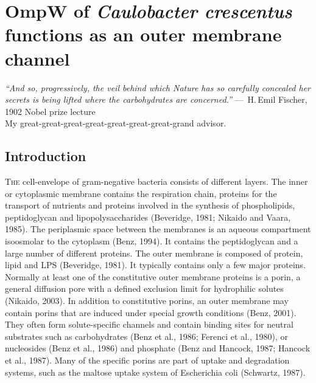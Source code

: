 \acresetall

\chapter{OmpW of \textit{Caulobacter crescentus} functions as an outer membrane channel}
\label{ch:porin}
\begin{epigraph}
  \emph{``And so, progressively, the veil behind which Nature has so carefully concealed her secrets is being lifted where the carbohydrates are concerned.''} ---~H.\,Emil Fischer, 1902 Nobel prize lecture\\ My great-great-great-great-great-great-great-grand advisor.
\end{epigraph}
\section{Introduction} %
\label{sec:porin_introduction} 
    \lettrine[lines=2]{T}{he} cell-envelope of gram-negative bacteria consists of different layers. The inner or cytoplasmic membrane contains the respiration chain, proteins for the transport of nutrients and proteins involved in the synthesis of phospholipids, peptidoglycan and lipopolysaccharides (Beveridge, 1981; Nikaido and Vaara, 1985). The periplasmic space between the membranes is an aqueous compartment isoosmolar to the cytoplasm (Benz, 1994). It contains the peptidoglycan and a large number of different proteins. The outer membrane is composed of protein, lipid and \ac{LPS} (Beveridge, 1981). It typically contains only a few major proteins. Normally at least one of the constitutive outer membrane proteins is a porin, a general diffusion pore with a defined exclusion limit for hydrophilic solutes (Nikaido, 2003). In addition to constitutive porins, an outer membrane may contain porins that are induced under special growth conditions (Benz, 2001). They often form solute-specific channels and contain binding sites for neutral substrates such as carbohydrates (Benz et al., 1986; Ferenci et al., 1980), or nucleosides (Benz et al., 1986) and phosphate (Benz and Hancock, 1987; Hancock et al., 1987). Many of the specific porins are part of uptake and degradation systems, such as the maltose uptake system of Escherichia coli (Schwartz, 1987). 

